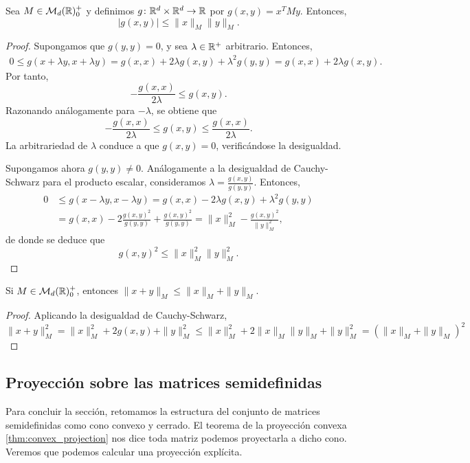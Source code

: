 \begin{thm} \label{thm:cauchy_schwarz}
    Sea $M \in \mathcal{M}_d(\mathbb{R})^+_0$ y definimos $g \colon \mathbb{R}^d \times \mathbb{R}^d \to \mathbb{R}$ por $g(x,y) = x^TMy$. Entonces,
    \[ |g(x,y)| \le \|x\|_M\|y\|_M. \]
\end{thm}
\begin{proof}
    Supongamos que $g(y,y)=0$, y sea $\lambda \in \mathbb{R}^+$ arbitrario. Entonces,
    \begin{align*}
        0 \le g(x + \lambda y, x+\lambda y) = g(x,x) + 2\lambda g(x,y) + \lambda^2 g(y,y) = g(x,x) + 2\lambda g(x,y).
    \end{align*}
    Por tanto,
    \[ - \frac{g(x,x)}{2\lambda} \le g(x,y). \]
    Razonando análogamente para $-\lambda$, se obtiene que
    \[ - \frac{g(x,x)}{2\lambda} \le g(x,y) \le \frac{g(x,x)}{2\lambda}.\]
    La arbitrariedad de $\lambda$ conduce a que $g(x,y)=0$, verificándose la desigualdad.

    Supongamos ahora $g(y,y) \ne 0$. Análogamente a la desigualdad de Cauchy-Schwarz para el producto escalar, consideramos $\lambda = \frac{g(x,y)}{g(y,y)}$. Entonces,
    \begin{align*}
        0 &\le g(x - \lambda y, x - \lambda y) = g(x,x) - 2\lambda g(x,y) + \lambda^2g(y,y) \\
          &= g(x,x) - 2 \frac{g(x,y)^2}{g(y,y)}+\frac{g(x,y)^2}{g(y,y)} = \|x\|_M^2 - \frac{g(x,y)^2}{\|y\|_M^2},
    \end{align*}
    de donde se deduce que
    \[ g(x,y)^2 \le \|x\|_M^2\|y\|_M^2. \]
\end{proof}

\begin{cor}
    Si $M \in \mathcal{M}_d(\mathbb{R})^+_0$, entonces $\|x+y\|_M \le \|x\|_M + \|y\|_M$.
\end{cor}
\begin{proof}
    Aplicando la desigualdad de Cauchy-Schwarz,
    \[ \|x+y\|^2_M = \|x\|^2_M + 2g(x,y) + \|y\|_M^2 \le \|x\|^2_M + 2\|x\|_M\|y\|_M + \|y\|^2_M = (\|x\|_M + \|y\|_M)^2 \]
\end{proof}

\subsection{Proyección sobre las matrices semidefinidas}

Para concluir la sección, retomamos la estructura del conjunto de matrices semidefinidas como cono convexo y cerrado. El teorema de la proyección convexa \ref{thm:convex_projection} nos dice toda matriz podemos proyectarla a dicho cono. Veremos que podemos calcular una proyección explícita.

